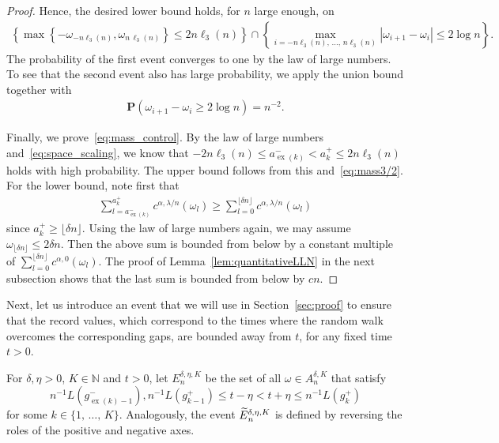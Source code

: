 \documentclass[AHL,Unicode,longabstracts,published]{cedram}
\newcommand{\N}{\mathbb N}
\newcommand{\bfP}{\mathbf{P}}
\newcommand\ex{\operatorname{ex}}
\newcommand{\aat}[1]{a_{\ex(#1)}^-}
\newcommand{\gtt}[1]{g_{\ex(#1)-1}^-}
\let\oldtilde\tilde
\renewcommand*{\tilde}[1]{\mathchoice{\widetilde{#1}}{\widetilde{#1}}{\oldtilde{#1}}{\oldtilde{#1}}}
\begin{document}
\begin{proof}
Hence, the desired lower bound holds, for $n$ large enough, on
\begin{align*}
\left\{\max\left\{-\omega_{-n\ell_3(n)},\omega_{n\,\ell_3(n)}\right\}\leq 2n\ell_3(n)\right\}\cap\left\{\max_{i=-n\ell_3(n),\,\dots,\,n\ell_3(n)}\left|\omega_{i+1}-\omega_i\right|\leq 2\log n\right\}.
\end{align*}
The probability of the first event converges to one by the law of large numbers. To see that the second event also has large probability, we apply the union bound together with
\begin{align*}
\bfP(\omega_{i+1}-\omega_i\geq 2\log n)=n^{-2}.
\end{align*}

Finally, we prove~\eqref{eq:mass_control}. By the law of large numbers and~\eqref{eq:space_scaling}, we know that $-2n\ell_3(n)\le \aat{k}< a_k^+\le 2n\ell_3(n)$ holds with high probability. The upper bound follows from this and~\eqref{eq:mass3/2}. For the lower bound, note first that
\begin{align*}
\sum_{l=\aat{k}}^{a_k^+} c^{\alpha,\lambda/n}(\omega_l)
\ge \sum_{l=0}^{\lfloor \delta n \rfloor} c^{\alpha,\lambda/n}(\omega_l)
\end{align*}
since $a_k^+ \ge \lfloor \delta n \rfloor$. Using the law of large numbers again, we may assume $\omega_{\lfloor \delta n \rfloor} \le 2\delta n$. Then the above sum is bounded from below by a constant multiple of $\sum_{l=0}^{\lfloor \delta n \rfloor} c^{\alpha,0}(\omega_l)$. The proof of Lemma~\ref{lem:quantitativeLLN} in the next subsection shows that the last sum is bounded from below by $cn$.
\end{proof}

Next, let us introduce an event that we will use in Section~\ref{sec:proof} to ensure that the record values, which correspond to the times where the random walk overcomes the corresponding gaps, are bounded away from $t$, for any fixed time $t>0$.

\begin{defi}\label{def:E}
For $\delta, \eta>0$, $K\in\N$ and $t>0$, let $E_n^{\delta,\eta,K}$ be the set of all $\omega\in A_n^{\delta,K}$ that satisfy
\[
n^{-1}L\left(\gtt{k}\right),n^{-1}L\left(g_{k-1}^+\right)\leq t-\eta<t+\eta\leq n^{-1}L\left(g_{k}^+\right)
\]
for some $k\in\{1,\,\dots,\,K\}$. Analogously, the event $\tilde{E}_n^{\delta,\eta,K}$ is defined by reversing the roles of the positive and negative axes.
\end{defi}
\end{document}
